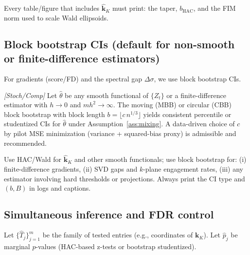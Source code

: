 \begin{remark}\label{rem:hac-report}
Every table/figure that includes $\widehat{\mathbf k}_K$ must print: the taper, $b_{\mathrm{HAC}}$, and the FIM norm used to scale Wald ellipsoids.
\end{remark}

\subsection{Block bootstrap CIs (default for non-smooth or finite-difference estimators)}\label{subsec:bb}

For gradients (score/FD) and the spectral gap $\Delta\sigma$, we use block bootstrap CIs.

\begin{proposition}\label{prop:bb}
\emph{[\textup{Stoch/Comp}]}
Let $\widehat\theta$ be any smooth functional of $\{Z_t\}$ or a finite-difference estimator with $h\to0$ and $mh^2\to\infty$.
The moving (MBB) or circular (CBB) block bootstrap with block length
$b=\lfloor c\,n^{1/3}\rfloor$ yields consistent percentile or studentized CIs for $\widehat\theta$ under Assumption~\ref{ass:mixing}.
A data-driven choice of $c$ by pilot MSE minimization (variance + squared-bias proxy) is admissible and recommended.
\end{proposition}

\begin{remark}\label{rem:which-ci}
Use HAC/Wald for $\widehat{\mathbf k}_K$ and other smooth functionals; use block bootstrap for: (i) finite-difference gradients, (ii) SVD gaps and $k$-plane engagement rates, (iii) any estimator involving hard thresholds or projections. Always print the CI type and $(b,B)$ in logs and captions.
\end{remark}

\subsection{Simultaneous inference and FDR control}\label{subsec:fdr}

Let $\{\widehat T_j\}_{j=1}^m$ be the family of tested entries (e.g., coordinates of $\mathbf k_K$). Let $\widehat p_j$ be marginal $p$-values (HAC-based z-tests or bootstrap studentized).

